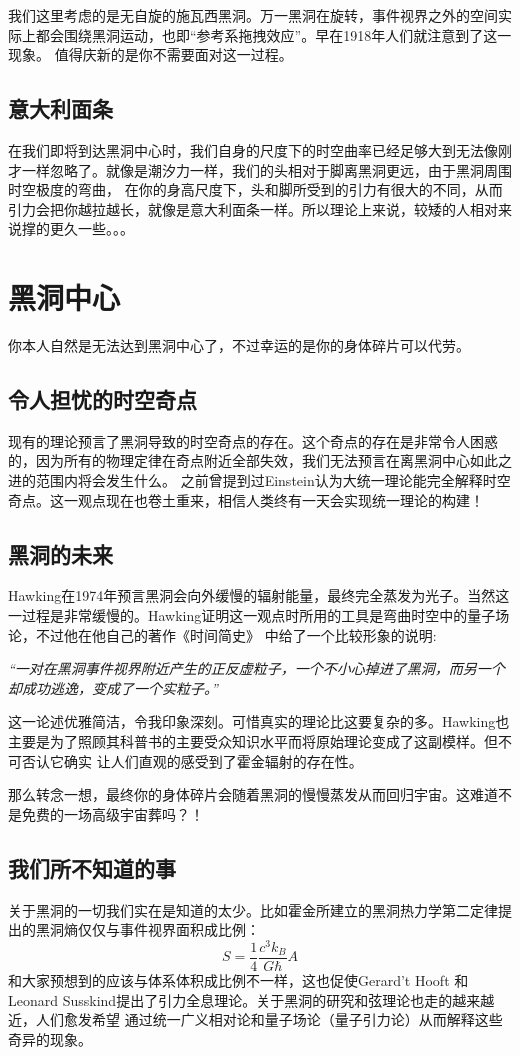 \documentclass{ctexart}
\begin{document}
    我们这里考虑的是无自旋的施瓦西黑洞。万一黑洞在旋转，事件视界之外的空间实际上都会围绕黑洞运动，也即“参考系拖拽效应”。早在1918年人们就注意到了这一现象。\cite{thirring1918effect}
    值得庆新的是你不需要面对这一过程。
    \subsection{意大利面条}
    在我们即将到达黑洞中心时，我们自身的尺度下的时空曲率已经足够大到无法像刚才一样忽略了。就像是潮汐力一样，我们的头相对于脚离黑洞更远，由于黑洞周围时空极度的弯曲，
    在你的身高尺度下，头和脚所受到的引力有很大的不同，从而引力会把你越拉越长，就像是意大利面条一样。\cite{time}所以理论上来说，较矮的人相对来说撑的更久一些。。。

    \section{黑洞中心}
    你本人自然是无法达到黑洞中心了，不过幸运的是你的身体碎片可以代劳。
    \subsection{令人担忧的时空奇点}
    现有的理论预言了黑洞导致的时空奇点的存在。这个奇点的存在是非常令人困惑的，因为所有的物理定律在奇点附近全部失效，我们无法预言在离黑洞中心如此之进的范围内将会发生什么。
    之前曾提到过Einstein认为大统一理论能完全解释时空奇点。这一观点现在也卷土重来，相信人类终有一天会实现统一理论的构建！
    \subsection{黑洞的未来}
    Hawking在1974年预言黑洞会向外缓慢的辐射能量，最终完全蒸发为光子。当然这一过程是非常缓慢的。Hawking证明这一观点时所用的工具是弯曲时空中的量子场论，不过他在他自己的著作《时间简史》
    中给了一个比较形象的说明\cite{time}:

    {\itshape“一对在黑洞事件视界附近产生的正反虚粒子，一个不小心掉进了黑洞，而另一个却成功逃逸，变成了一个实粒子。”}

    这一论述优雅简洁，令我印象深刻。可惜真实的理论比这要复杂的多。Hawking也主要是为了照顾其科普书的主要受众知识水平而将原始理论变成了这副模样。但不可否认它确实
    让人们直观的感受到了霍金辐射的存在性。

    那么转念一想，最终你的身体碎片会随着黑洞的慢慢蒸发从而回归宇宙。这难道不是免费的一场高级宇宙葬吗？！
    \subsection{我们所不知道的事}
    关于黑洞的一切我们实在是知道的太少。比如霍金所建立的黑洞热力学第二定律提出的黑洞熵仅仅与事件视界面积成比例：
    \begin{equation}
        S=\frac{1}{4}\frac{c^3k_B}{G\hbar}A
    \end{equation}
    和大家预想到的应该与体系体积成比例不一样，这也促使Gerard't Hooft 和 Leonard Susskind提出了引力全息理论。\cite{hooft2001holographic}关于黑洞的研究和弦理论也走的越来越近，人们愈发希望
    通过统一广义相对论和量子场论（量子引力论）从而解释这些奇异的现象。
\end{document}
